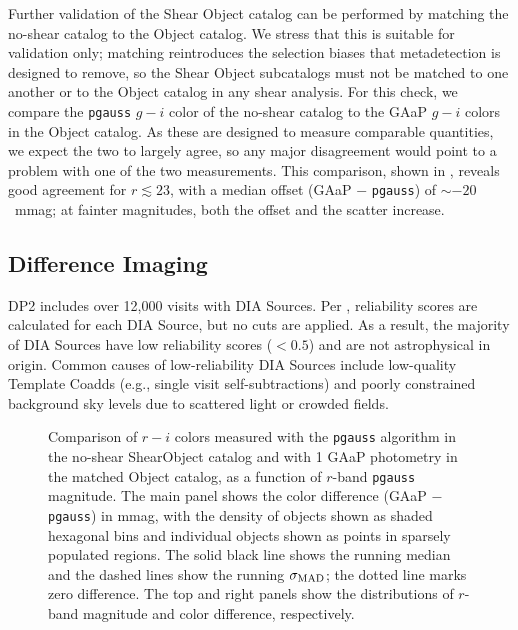 Further validation of the Shear Object catalog can be performed by matching the no-shear catalog to the \gls{Object} catalog.
We stress that this is suitable for validation only; matching reintroduces the selection biases that metadetection is designed to remove, so the Shear \gls{Object} subcatalogs must not be matched to one another or to the \gls{Object} catalog in any shear analysis.
For this check, we compare the \texttt{pgauss} $g-i$ color of the no-shear catalog to the \gls{GAaP} $g-i$ colors in the \gls{Object} catalog.
As these are designed to measure comparable quantities, we expect the two to largely agree, so any major disagreement would point to a problem with one of the two measurements.
This comparison, shown in , reveals good agreement for $r \lesssim 23$, with a median offset (\gls{GAaP} $-$ \texttt{pgauss}) of $\sim -20$~mmag; at fainter magnitudes, both the offset and the scatter increase.

\subsection{Difference Imaging}
\gls{DP2} includes over 12,000 visits with \gls{DIA} Sources.
Per , reliability scores are calculated for each \gls{DIA} \gls{Source}, but no cuts are applied.
As a result, the majority of \gls{DIA} Sources have low reliability scores ($< 0.5$) and are not astrophysical in origin.
Common causes of low-reliability \gls{DIA} Sources include low-quality \gls{Template} Coadds (e.g., single visit self-subtractions) and poorly constrained background sky levels due to scattered light or crowded fields.

\begin{figure}[tpb]
\caption{Comparison of $r-i$ colors measured with the \texttt{pgauss} \gls{algorithm} in the no-shear \gls{ShearObject} catalog and with 1 \gls{GAaP} photometry in the matched \gls{Object} catalog, as a function of $r$-band \texttt{pgauss} magnitude.
The main panel shows the color difference (\gls{GAaP} $-$ \texttt{pgauss}) in mmag, with the density of objects shown as shaded hexagonal bins and individual objects shown as points in sparsely populated regions.
The solid black line shows the running median and the dashed lines show the running $\sigma_{\rm MAD}$; the dotted line marks zero difference.
The top and right panels show the distributions of $r$-band magnitude and color difference, respectively. \label{fig:dp2_shear_pgauss_gaap}}
\end{figure}

